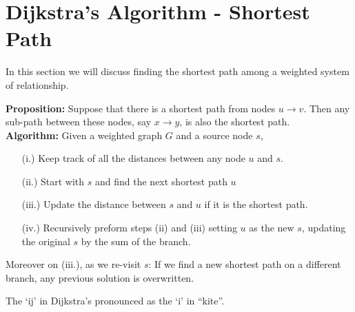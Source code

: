 \newpage
\section{Dijkstra's Algorithm - Shortest Path}
\noindent
In this section we will discuss finding the shortest path among a weighted system of relationship.

\begin{theo}
    
    \textbf{Proposition:} Suppose that there is a shortest path from nodes $u\to v$. Then any
    sub-path between these nodes, say $x\to y$, is also the shortest path.\\

    \noindent
    \textbf{Algorithm:} Given a weighted graph $G$ and a source node $s$, 
    \begin{enumerate}
        \item [(i.)] Keep track of all the distances between any node $u$ and $s$.
        \item [(ii.)] Start with $s$ and find the next shortest path $u$
        \item [(iii.)] Update the distance between $s$ and $u$ if it is the shortest path.
        \item [(iv.)] Recursively preform steps (ii) and (iii) setting $u$ as the new $s$, updating the original $s$ by the sum of the branch.
    \end{enumerate}

    \noindent
    Moreover on (iii.), as we re-visit $s$: If we find a new shortest path on a different branch, any previous solution is overwritten.
\end{theo}

\vspace{-.5em}
\begin{Tip}
    The `ij' in Dijkstra's pronounced as the `i' in ``kite''.
\end{Tip}

